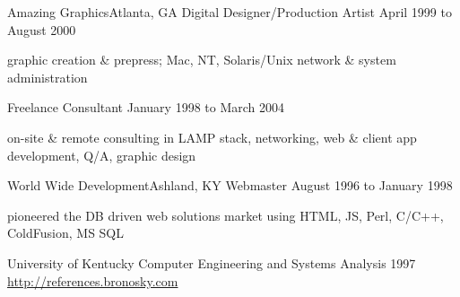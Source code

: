\documentclass[10pt]{article}
\begin{document}
\sectionheader
{Amazing Graphics}{Atlanta, GA}
{Digital Designer/Production Artist}
{April 1999 to August 2000}
\begin{longtext}
graphic creation \& prepress;
Mac, NT, Solaris/Unix network \& system administration
\end{longtext}

\sectionheader
{Freelance}{}
{Consultant}
{January 1998 to March 2004}
\begin{longtext}
on-site \& remote consulting in LAMP stack, networking, web \& client app development, Q/A, graphic design
\end{longtext}

\sectionheader
{World Wide Development}{Ashland, KY}
{Webmaster}
{August 1996 to January 1998}
\begin{longtext}
pioneered the DB driven web solutions market using HTML, JS, Perl, C/C++, ColdFusion, MS SQL
\end{longtext}


\sectionheader
{University of Kentucky}{}
{Computer Engineering and Systems Analysis}
{1997}
\fix
\halfskip
\href{http://references.bronosky.com}{http://references.bronosky.com}
\end{document}

